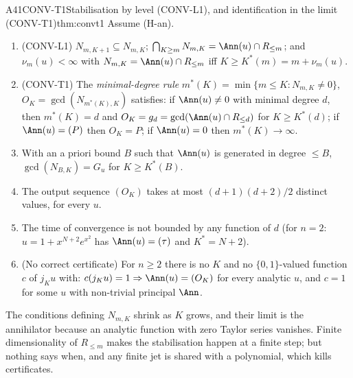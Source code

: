 \begin{dimcard}{A41}{CONV-T1}{Stabilisation by level (CONV-L1), and identification in the limit (CONV-T1)}{\proved}{thm:convt1}
Assume (H-an).
\begin{enumerate}[label=(\alph*)]
\item (CONV-L1) $N_{m,K+1}\subseteq N_{m,K}$; $\bigcap_{K\ge m}N_{m,K}=\Ann(u)\cap R_{\le m}$; and $\nu_m(u)<\infty$ with $N_{m,K}=\Ann(u)\cap R_{\le m}$ iff $K\ge K^*(m)=m+\nu_m(u)$.
\item (CONV-T1) The \emph{minimal-degree rule} $m^*(K)=\min\{m\le K:N_{m,K}\ne0\}$, $O_K=\gcd(N_{m^*(K),K})$ satisfies: if $\Ann(u)\ne0$ with minimal degree $d$, then $m^*(K)=d$ and $O_K=g_d=\gcd(\Ann(u)\cap R_{\le d})$ for $K\ge K^*(d)$; if $\Ann(u)=(P)$ then $O_K=P$; if $\Ann(u)=0$ then $m^*(K)\to\infty$.
\item With an a priori bound $B$ such that $\Ann(u)$ is generated in degree $\le B$, $\gcd(N_{B,K})=G_u$ for $K\ge K^*(B)$.
\item The output sequence $(O_K)$ takes at most $(d+1)(d+2)/2$ distinct values, for every $u$.
\item The time of convergence is not bounded by any function of $d$ (for $n=2$: $u=1+x^{N+2}e^{x^2}$ has $\Ann(u)=(\tau)$ and $K^*=N+2$).
\item (No correct certificate) For $n\ge2$ there is no $K$ and no $\{0,1\}$-valued function $c$ of $j_Ku$ with: $c(j_Ku)=1\Rightarrow\Ann(u)=(O_K)$ for every analytic $u$, and $c=1$ for some $u$ with non-trivial principal $\Ann$.
\end{enumerate}
\end{dimcard}

\begin{proofidea}
The conditions defining $N_{m,K}$ shrink as $K$ grows, and their limit is the annihilator because an analytic function with zero Taylor series vanishes. Finite dimensionality of $R_{\le m}$ makes the stabilisation happen at a finite step; but nothing says when, and any finite jet is shared with a polynomial, which kills certificates.
\end{proofidea}

